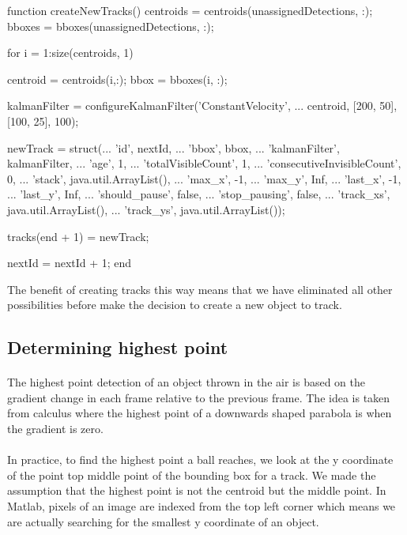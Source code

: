 \documentclass[10pt,a4paper]{article}
\begin{document}
\begin{verbatimtab}
function createNewTracks()
	centroids = centroids(unassignedDetections, :);
	bboxes = bboxes(unassignedDetections, :);

	for i = 1:size(centroids, 1)

		centroid = centroids(i,:);
		bbox = bboxes(i, :);

		kalmanFilter = configureKalmanFilter('ConstantVelocity', ...
			centroid, [200, 50], [100, 25], 100);

		newTrack = struct(...
			'id', nextId, ...
			'bbox', bbox, ...
			'kalmanFilter', kalmanFilter, ...
			'age', 1, ...
			'totalVisibleCount', 1, ...
			'consecutiveInvisibleCount', 0, ...
			'stack', java.util.ArrayList(), ...
			'max_x', -1, ...
			'max_y', Inf, ...
			'last_x', -1, ...
			'last_y', Inf, ...
			'should_pause', false, ...
			'stop_pausing', false, ...
			'track_xs', java.util.ArrayList(), ...
			'track_ys', java.util.ArrayList());

		tracks(end + 1) = newTrack;

		nextId = nextId + 1;
	end
\end{verbatimtab}

The benefit of creating tracks this way means that we have eliminated all other possibilities before make the decision to create a new object to track.

\subsection{Determining highest point}

\paragraph{} The highest point detection of an object thrown in the air is based on the gradient change in each frame relative to the previous frame. The idea is taken from calculus where the highest point of a downwards shaped parabola is when the gradient is zero. 
\paragraph{} In practice, to find the highest point a ball reaches, we look at the y coordinate of the point top middle point of the bounding box for a track. We made the assumption that the highest point is not the centroid but the middle point. In Matlab, pixels of an image are indexed from the top left corner which means we are actually searching for the smallest y coordinate of an object.
\end{document}
